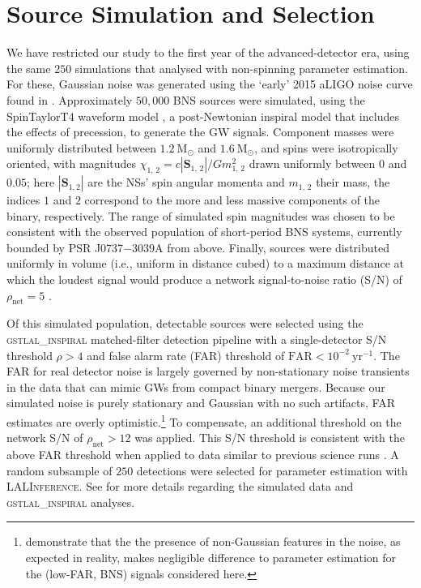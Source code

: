 \section{Source Simulation and Selection}\label{sec:sources}

We have restricted our study to the first year of the advanced-detector era, using the same $250$ simulations that \citet{Singer_2014} analysed with non-spinning parameter estimation. For these, Gaussian noise was generated using the `early' 2015 aLIGO noise curve found in \citet{Barsotti:2012}. Approximately $50,000$ BNS sources were simulated, using the SpinTaylorT4 waveform model \citep{Buonanno_2003,Buonanno_2009}, a post-Newtonian inspiral model that includes the effects of precession, to generate the GW signals. Component masses were uniformly distributed between $1.2~\mathrm{M}_\odot$ and $1.6~\mathrm{M}_\odot$, and spins were isotropically oriented, with magnitudes $\chi_{1,\,2} = c |\mathbf{S}_{1,\,2}|/G m_{1,\,2}^2$ drawn uniformly between $0$ and $0.05$; here $|\mathbf{S}_{1,2}|$ are the NSs' spin angular momenta and $m_{1,\,2}$ their mass, the indices $1$ and $2$ correspond to the more and less massive components of the binary, respectively.  The range of simulated spin magnitudes was chosen to be consistent with the observed population of short-period BNS systems, currently bounded by PSR J0737$-$3039A \citep{Burgay_2003,Brown_2012} from above.  Finally, sources were distributed uniformly in volume (i.e., uniform in distance cubed) to a maximum distance at which the loudest signal would produce a network signal-to-noise ratio (S/N) of $\rho_\mathrm{net} = 5$ \citep{Singer_2014}.

Of this simulated population, detectable sources were selected using the \textsc{gstlal\_inspiral} matched-filter detection pipeline \citep{Cannon_2012} with a single-detector S/N threshold $\rho>4$ and false alarm rate (FAR) threshold of $\mathrm{FAR}<10^{-2}~\mathrm{yr}^{-1}$.  The FAR for real detector noise is largely governed by non-stationary noise transients in the data that can mimic GWs from compact binary mergers.  Because our simulated noise is purely stationary and Gaussian with no such artifacts, FAR estimates are overly optimistic.\footnote{\citet{Berry_2014} demonstrate that the the presence of non-Gaussian features in the noise, as expected in reality, makes negligible difference to parameter estimation for the (low-FAR, BNS) signals considered here.} To compensate, an additional threshold on the network S/N of $\rho_\mathrm{net} > 12$ was applied. This S/N threshold is consistent with the above FAR threshold when applied to data similar to previous science runs \cite{2013arXiv1304.0670L,Berry_2014}. A random subsample of $250$ detections were selected for parameter estimation with \textsc{LALInference}. See \citet{Singer_2014} for more details regarding the simulated data and \textsc{gstlal\_inspiral} analyses.
  
  
  
  
  
  
  
  